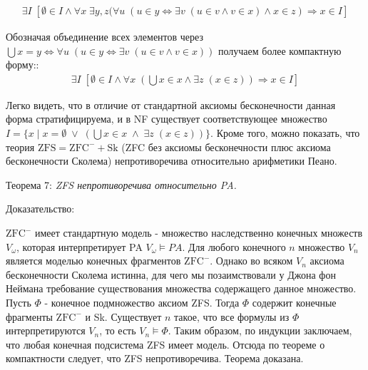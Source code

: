 \documentclass[12pt]{article}
\begin{document}
\begin{equation}
\begin{gathered}
\exists I \; [\emptyset \in I \wedge \forall x \; \exists y, z (\forall u \; (u \in y \Leftrightarrow \exists v  \; (u \in v \wedge v \in x) \wedge x \in z) \Rightarrow x \in I]
\label{axiom:skolem-infinity}
\end{gathered}
\end{equation}

Обозначая объединение всех элементов через $\bigcup x = y \Leftrightarrow \forall u \; (u \in y \Leftrightarrow \exists v  \; (u \in v \wedge v \in x))$ получаем более компактную форму::
\begin{equation}
\begin{gathered}
\exists I \; [\emptyset \in I \wedge \forall x \; (\bigcup x \in x \wedge \exists z \; (x \in z)) \Rightarrow x \in I]
\label{axiom:skolem-infinity-short}
\end{gathered}
\end{equation}

Легко видеть, что в отличие от стандартной аксиомы бесконечности данная форма стратифицируема, и в NF существует соответствующее множество $I = \{ x \mid x = \emptyset \; \vee \; (\bigcup x \in x \; \wedge \; \exists z \; (x \in z))\}$. Кроме того, можно показать, что теория $\mathrm{ZFS} = \mathrm{ZFC}^- + \mathrm{Sk}$ (ZFC без аксиомы бесконечности плюс аксиома бесконечности Сколема) непротиворечива относительно арифметики Пеано.

Теорема 7: {\sl ZFS непротиворечива относительно PA.}

Доказательство: 

$\mathrm{ZFC}^-$ имеет стандартную модель - множество наследственно конечных множеств $V_{\omega}$, которая интерпретирует PA $V_{\omega} \models PA$. Для любого конечного $n$ множество $V_n$ является моделью конечных фрагментов $\mathrm{ZFC}^-$. Однако во всяком $V_n$ аксиома бесконечности Сколема истинна, для чего мы позаимствовали у Джона фон Неймана требование существования множества содержащего данное множество. Пусть $\Phi$ - конечное подмножество аксиом ZFS. Тогда $\Phi$ содержит конечные фрагменты $\mathrm{ZFC}^-$ и Sk. Существует $n$ такое, что все формулы из $\Phi$ интерпретируются $V_n$, то есть $V_n \models \Phi$. Таким образом, по индукции заключаем, что любая конечная подсистема ZFS имеет модель. Отсюда по теореме о компактности \cite{godel-compactness-logic} следует, что ZFS непротиворечива. Теорема доказана.
\end{document}
